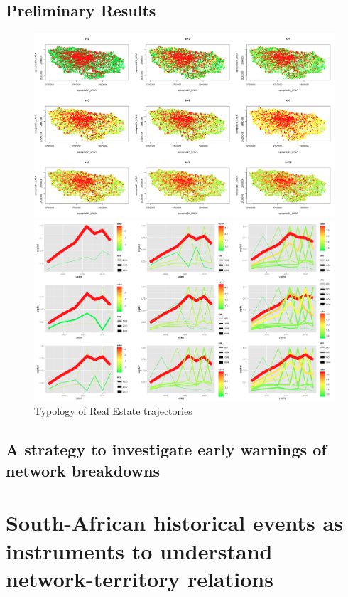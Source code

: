 \subsection{Preliminary Results}




\begin{figure}
\centering
\phantom{}\hspace{-1cm}\includegraphics[width=1.2\textwidth]{Figures/PartII/Empirical/RealEstate/normalized_k2-10}
\smallskip

\phantom{}\hspace{-1cm}\includegraphics[width=1.2\textwidth]{Figures/PartII/Empirical/RealEstate/trajectories_normalized_k=2-10}
\caption[Typology of Real Estate trajectories]{Typology of Real Estate trajectories}
\end{figure}




\subsection{A strategy to investigate early warnings of network breakdowns}









\newpage

\section{South-African historical events as instruments to understand network-territory relations}








